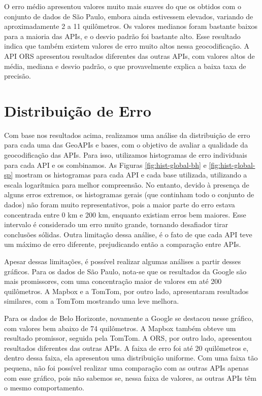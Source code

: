 O erro médio apresentou valores muito mais suaves do que os obtidos com o conjunto de dados de São Paulo, embora ainda estivessem elevados, variando de aproximadamente 2 a 11 quilômetros. Os valores medianos foram bastante baixos para a maioria das APIs, e o desvio padrão foi bastante alto. Esse resultado indica que também existem valores de erro muito altos nessa geocodificação. A API ORS apresentou resultados diferentes das outras APIs, com valores altos de média, mediana e desvio padrão, o que provavelmente explica a baixa taxa de precisão.

\section{Distribuição de Erro}

Com base nos resultados acima, realizamos uma análise da distribuição de erro para cada uma das GeoAPIs e bases, com o objetivo de avaliar a qualidade da geocodificação das APIs. Para isso, utilizamos histogramas de erro individuais para cada API e os combinamos. As Figuras \ref{fig:hist-global-bh} e \ref{fig:hist-global-sp} mostram os histogramas para cada API e cada base utilizada, utilizando a escala logarítmica para melhor compreensão. No entanto, devido à presença de alguns erros extremos, os histogramas gerais (que continham todo o conjunto de dados) não foram muito representativos, pois a maior parte do erro estava concentrada entre 0 km e 200 km, enquanto existiam erros bem maiores. Esse intervalo é considerado um erro muito grande, tornando desafiador tirar conclusões sólidas. Outra limitação dessa análise, é o fato de que cada API teve um máximo de erro diferente, prejudicando então a comparação entre APIs. 

Apesar dessas limitações, é possível realizar algumas análises a partir desses gráficos. Para os dados de São Paulo, nota-se que os resultados da Google são mais promissores, com uma concentração maior de valores em até 200 quilômetros. A Mapbox e a TomTom, por outro lado, apresentaram resultados similares, com a TomTom mostrando uma leve melhora.

Para os dados de Belo Horizonte, novamente a Google se destacou nesse gráfico, com valores bem abaixo de 74 quilômetros. A Mapbox também obteve um resultado promissor, seguida pela TomTom. A ORS, por outro lado, apresentou resultados diferentes das outras APIs. A faixa de erro foi até 20 quilômetros e, dentro dessa faixa, ela apresentou uma distribuição uniforme. Com uma faixa tão pequena, não foi possível realizar uma comparação com as outras APIs apenas com esse gráfico, pois não sabemos se, nessa faixa de valores, as outras APIs têm o mesmo comportamento. 

